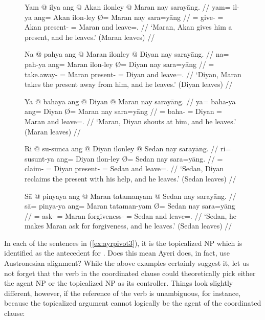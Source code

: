 \begin{figure}
\pex\label{ex:ayrpivot3}
\a\label{ex:ayrpivot3_dat}\begingl
	\gla Yam @ ilya ang @ Akan ilonley {} @ Maran nay sarayāng. //
	\glb yam= il-ya ang= Akan ilon-ley Ø= Maran nay sara=yāng //
	\glc \DatT{}= give-\TsgM{} \Aarg{}= Akan present-\PargI{} \Top{}= Maran
		and leave=\TsgM{}.\Aarg{} //
	\glft `Maran, Akan gives him a present, and he leaves.' (Maran leaves) //
\endgl

\a\label{ex:ayrpivot3_gen}\begingl
	\gla Na @ pahya ang @ Maran ilonley {} @ Diyan nay sarayāng. //
	\glb na= pah-ya ang= Maran ilon-ley Ø= Diyan nay sara=yāng //
	\glc \GenT{}= take.away-\TsgM{} \Aarg{}= Maran present-\PargI{} \Top{}=
		Diyan and leave=\TsgM{}.\Aarg{} //
	\glft `Diyan, Maran takes the present away from him, and he leaves.' (Diyan
		leaves) //
\endgl

\a\label{ex:ayrpivot3_loc}\begingl
	\gla Ya @ bahaya ang @ Diyan {} @ Maran nay sarayāng. //
	\glb ya= baha-ya ang= Diyan Ø= Maran nay sara=yāng //
	\glc \LocT{}= baha-\TsgM{} \Aarg{}= Diyan \Top{}= Maran and 
		leave=\TsgM{}.\Aarg{} //
	\glft `Maran, Diyan shouts at him, and he leaves.' (Maran leaves) //
\endgl

\a\label{ex:ayrpivot3_ins}\begingl
	\gla Ri @ su-sunca ang @ Diyan ilonley {} @ Sedan nay sarayāng. //
	\glb ri= su\til{}sunt-ya ang= Diyan ilon-ley Ø= Sedan nay sara=yāng. //
	\glc \InsT{}= \Iter{}\til{}claim-\TsgM{} \Aarg{}= Diyan present-\PargI{}
		\Top{}= Sedan and leave=\TsgM{}.\Aarg{} //
	\glft `Sedan, Diyan reclaims the present with his help, and he leaves.'
		(Sedan leaves) //
\endgl

\a\label{ex:ayrpivot3_cau}\begingl
	\gla Sā @ pinyaya ang @ Maran tatamanyam {} @ Sedan nay sarayāng. //
	\glb sā= pinya-ya ang= Maran tataman-yam Ø= Sedan nay sara=yāng //
	\glc \CauT{}= ask-\TsgM{} \Aarg{}= Maran forgiveness-\Dat{} \Top{}= Sedan
		and leave=\TsgM{}.\Aarg{} //
	\glft `Sedan, he makes Maran ask for forgiveness, and he leaves.' (Sedan
		leaves) //
\endgl

\xe
\end{figure}

In each of the sentences in (\ref{ex:ayrpivot3}), it is the topicalized NP
which is identified as the antecedent for .
Does this mean Ayeri does, in fact, use Austronesian alignment? While the above
examples certainly suggest it, let us not forget that the verb in the
coordinated clause could theoretically pick either the agent NP or the
topicalized NP as its controller. Things look slightly different, however, if
the reference of the verb is unambiguous, for instance, because the topicalized
argument cannot logically be the agent of the coordinated clause:

